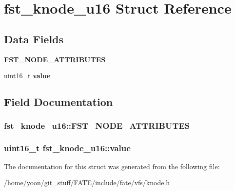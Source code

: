 \hypertarget{structfst__knode__u16}{\section{fst\-\_\-knode\-\_\-u16 Struct Reference}
\label{structfst__knode__u16}
}
\subsection*{Data Fields}
\begin{DoxyCompactItemize}
\item 
\hypertarget{structfst__knode__u16_ac3104afca97dd9e20ca7a83b1cad9311}{{\bfseries F\-S\-T\-\_\-\-N\-O\-D\-E\-\_\-\-A\-T\-T\-R\-I\-B\-U\-T\-E\-S}}\label{structfst__knode__u16_ac3104afca97dd9e20ca7a83b1cad9311}

\item 
\hypertarget{structfst__knode__u16_a43bee8ea74a671aa32837e965edb7e37}{uint16\-\_\-t {\bfseries value}}\label{structfst__knode__u16_a43bee8ea74a671aa32837e965edb7e37}

\end{DoxyCompactItemize}


\subsection{Field Documentation}
\hypertarget{structfst__knode__u16_ac3104afca97dd9e20ca7a83b1cad9311}{
\subsubsection[{F\-S\-T\-\_\-\-N\-O\-D\-E\-\_\-\-A\-T\-T\-R\-I\-B\-U\-T\-E\-S}]{\setlength{\rightskip}{0pt plus 5cm}fst\-\_\-knode\-\_\-u16\-::\-F\-S\-T\-\_\-\-N\-O\-D\-E\-\_\-\-A\-T\-T\-R\-I\-B\-U\-T\-E\-S}}\label{structfst__knode__u16_ac3104afca97dd9e20ca7a83b1cad9311}
\hypertarget{structfst__knode__u16_a43bee8ea74a671aa32837e965edb7e37}{
\subsubsection[{value}]{\setlength{\rightskip}{0pt plus 5cm}uint16\-\_\-t fst\-\_\-knode\-\_\-u16\-::value}}\label{structfst__knode__u16_a43bee8ea74a671aa32837e965edb7e37}


The documentation for this struct was generated from the following file\-:\begin{DoxyCompactItemize}
\item 
/home/yoon/git\-\_\-stuff/\-F\-A\-T\-E/include/fate/vfs/knode.\-h\end{DoxyCompactItemize}
